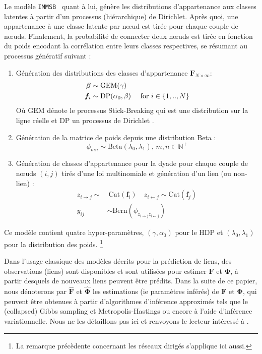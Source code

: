 \documentclass[french]{hermes-journal}
\renewcommand{\text}{\textnormal}
\newcommand{\immsb}{\texttt{IMMSB}}
\newcommand{\gem}{\mathrm{GEM}}
\newcommand{\DP}{\mathrm{DP}}
\newcommand{\mat}[1]{\bm{#1}}
\begin{document}
Le modèle \immsb~ quant à lui, génère les distributions d'appartenance aux classes latentes à partir d'un processus (hiérarchique) de Dirichlet. Après quoi, une appartenance à une classe latente par n\oe{}ud est tirée pour chaque couple de n\oe{}uds. Finalement, la probabilité de connecter deux n\oe{}uds est tirée en fonction du poids encodant la corrélation entre leurs classes respectives, se résumant au processus génératif suivant :
\begin{enumerate}
\item Génération des distributions des classes d'appartenance $\mat{F}_{N \times \infty}$:
   \begin{align}
       \bm{\beta} &\sim \gem(\gamma) \nonumber \\
    \mat{f}_i &\sim \DP(\alpha_0, \beta) \quad\text{ for }  i \in \{1, .., N\} \nonumber
   \end{align}  Où $\gem$ dénote le processus Stick-Breaking qui est une distribution sur la ligne réelle et $\DP$ un processus de Dirichlet \cite{HDP}.
\item Génération de la matrice de poids depuis une distribution Beta :\\
\[ \phi_{mn} \sim \mathrm{Beta}(\lambda_0,\lambda_1), \, m,n \in \mathbb{N}^{+} \]
\item Génération de classes d'appartenance pour la dyade pour chaque couple de n\oe{}uds $(i,j)$ tirés d'une loi multinomiale et génération d'un lien (ou non-lien) : 
   \begin{align}
       z_{i \rightarrow j} \sim&\ \mbox{Cat}(\mat{f}_i) \quad z_{i \leftarrow j} \sim \mbox{Cat}(\mat{f}_j) \nonumber \\
       y_{ij} &\sim \mathrm{Bern}(\phi_{z_{i \rightarrow j}z_{i \leftarrow j}}) \nonumber
    \label{eq:link-immsb}
   \end{align}
\end{enumerate}


Ce modèle contient quatre hyper-paramètres, $(\gamma, \alpha_0)$ pour le HDP et $(\lambda_0, \lambda_1)$ pour la distribution des poids. \footnote{La remarque précèdente concernant les réseaux dirigés s'applique ici aussi.}

Dans l'usage classique des modèles décrits pour la prédiction de liens, des observations (liens) sont disponibles et sont utilisées pour estimer  $\mat{F}$ et $\mat{\Phi}$, à partir desquels de nouveaux liens peuvent être prédits. Dans la suite de ce papier, nous dénoterons par $\mat{\hat{F}}$ et $\mat{\hat{\Phi}}$ les estimations (ie paramètres inférés) de $\mat{F}$ et $\mat{\Phi}$, qui peuvent être obtenues à partir d'algorithmes d'inférence approximés tels que le (collapsed) Gibbs sampling et Metropolis-Hastings ou encore à l'aide d'inférence variationnelle. Nous ne les détaillons pas ici et renvoyons le lecteur intéressé à \cite{ILFRM,IBP,HDP,fan2015dynamic}.
\end{document}
